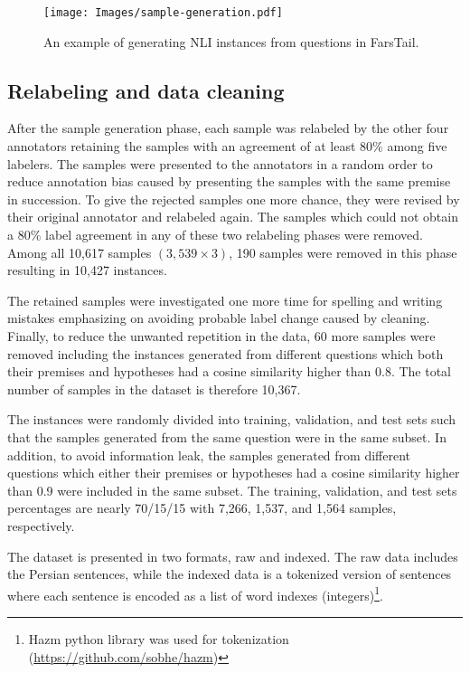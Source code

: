 \documentclass[preprint,12pt]{elsarticle}
\begin{document}
\begin{figure}[t!]
    \centering
    \texttt{[image: Images/sample-generation.pdf]}
    \caption{An example of generating NLI instances from questions in FarsTail.}
    \label{fig:generation}
\end{figure}

\subsection{Relabeling and data cleaning}
\label{subsec:relabel}
After the sample generation phase, each sample was relabeled by the other four annotators retaining the samples with an agreement of at least 80\% among five labelers. The samples were presented to the annotators in a random order to reduce annotation bias caused by presenting the samples with the same premise in succession. To give the rejected samples one more chance, they were revised by their original annotator and relabeled again. The samples which could not obtain a 80\% label agreement in any of these two relabeling phases were removed. Among all 10,617 samples $(3,539\times3)$, 190 samples were removed in this phase resulting in 10,427 instances.

The retained samples were investigated one more time for spelling and writing mistakes emphasizing on avoiding probable label change caused by cleaning. Finally, to reduce the unwanted repetition in the data, 60 more samples were removed including the instances generated from different questions which both their premises and hypotheses had a cosine similarity higher than 0.8. The total number of samples in the dataset is therefore 10,367. 

The instances were randomly divided into training, validation, and test sets such that the samples generated from the same question were in the same subset. In addition, to avoid information leak, the samples generated from different questions which either their premises or hypotheses had a cosine similarity higher than 0.9 were included in the same subset. The training, validation, and test sets percentages are nearly 70/15/15 with 7,266, 1,537, and 1,564 samples, respectively.

The dataset is presented in two formats, raw and indexed. The raw data includes the Persian sentences, while the indexed data is a tokenized version of sentences where each sentence is encoded as a list of word indexes (integers)\footnote{Hazm python library was used for tokenization (\url{https://github.com/sobhe/hazm})}. 
\end{document}

